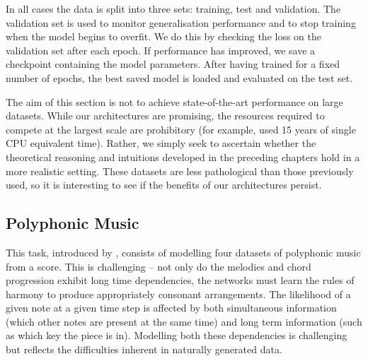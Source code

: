 In all cases the data is split into three sets: training, test and validation.
The validation set is used to monitor generalisation performance and to stop
training when the model begins to overfit. We do this by checking the loss on
the validation set after each epoch. If performance has improved,
we save a checkpoint containing the model parameters. After having trained for
a fixed number of epochs, the best saved model is loaded and
evaluated on the test set.

The aim of this section is not to achieve state-of-the-art performance on
large datasets. While our architectures are promising, the resources required
to compete at the largest scale are prohibitory (for example,
\autocite{Greff2016} used 15
years of single CPU equivalent time). Rather, we simply seek to ascertain whether the
theoretical reasoning and intuitions developed in the preceding chapters hold
in a more realistic setting. These datasets are less pathological than
those previously used, so it is interesting to see if the benefits
of our architectures persist.

\subsection{Polyphonic Music}
This task, introduced by 
\autocite{Boulanger-Lewandowski2012}, consists of modelling four datasets of
polyphonic music from a score. This is challenging -- not
only do the melodies and chord progression exhibit long time dependencies, the
networks must learn the rules of harmony to produce appropriately consonant
arrangements. The likelihood of a given note at a given time step is affected
by both simultaneous information (which other notes are present at the same time)
and long term information (such as which key the piece is in). Modelling
both these dependencies is challenging but reflects the difficulties inherent
in naturally generated data.



